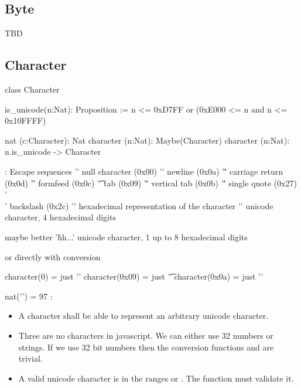 \subsection{Byte}

TBD

\subsection{Character}

\begin{alba}
  class Character

  is_unicode(n:Nat): Proposition :=
    n <= 0xD7FF or (0xE000 <= n and n <= 0x10FFFF)

  nat (c:Character): Nat
  character (n:Nat): Maybe(Character)
  character (n:Nat): n.is_unicode -> Character

  {: Escape sequences
    '\0'          null character (0x00)
    '\n'          newline (0x0a)
    '\r'          carriage return (0x0d)
    '\f'          formfeed (0x0c)
    '\t'          tab (0x09)
    '\v'          vertical tab (0x0b)
    '\''          single quote (0x27)
    '\\'          backslash (0x2c)
    '\xhh'        hexadecimal representation of the character
    '\uhhhh'      unicode character, 4 hexadecimal digits

    maybe better
    '\u{hh...}'   unicode character, 1 up to 8 hexadecimal digits

    or directly with conversion

    character(0)  =   just '\0'
    character(0x09) = just '\t'
    character(0x0a) = just '\n'

    nat('\a')  = 97
  :}
\end{alba}


\begin{itemize}

\item A character shall be able to represent an arbitrary unicode character.

\item Three are no characters in javascript. We can either use 32 numbers or
  strings. If we use 32 bit numbers then the conversion functions
   and  are trivial.

\item A valid unicode character is in the ranges  or
  . The function  must validate it.
\end{itemize}



